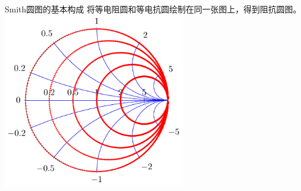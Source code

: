 \begin{frame}{Smith圆图的基本构成}
  将等电阻圆和等电抗圆绘制在同一张图上，得到阻抗圆图。
  \centering
  \includegraphics[width=8cm]{fig4-5.pdf}
\end{frame}

